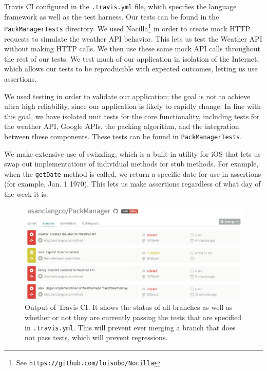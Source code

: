 \documentclass[11pt]{article}
\begin{document}
Travis CI configured in the \texttt{.travis.yml} file, which specifies the language framework as well as the test harness. Our tests can be found in the \texttt{PackManagerTests} directory. We used Nocilla\footnote{See \texttt{https://github.com/luisobo/Nocilla}} in order to create mock HTTP requests to simulate the weather API behavior. This lets us test the Weather API without making HTTP calls. We then use these same mock API calls throughout the rest of our tests. We test much of our application in isolation of the Internet, which allows our tests to be reproducible with expected outcomes, letting us use assertions.

We used testing in order to validate our application; the goal is not to achieve ultra high reliability, since our application is likely to rapidly change. In line with this goal, we have isolated unit tests for the core functionality, including tests for the weather API, Google APIs, the packing algorithm, and the integration between these components. These tests can be found in \texttt{PackManagerTests}. 

We make extensive use of swizzling, which is a built-in utility for iOS that lets us swap out implementations of individual methods for stub methods. For example, when the \texttt{getDate} method is called, we return a specific date for use in assertions (for example, Jan. 1 1970). This lets us make assertions regardless of what day of the week it is.



 
\begin{figure}
\centering
\includegraphics[width=\linewidth]{img/travis.png}
\caption{Output of Travis CI. It shows the status of all branches as well as whether or not they are currently passing the tests that are specified in \texttt{.travis.yml}. This will prevent ever merging a branch that does not pass tests, which will prevent regressions.}
\label{fig:travis}
\end{figure}
\end{document}
